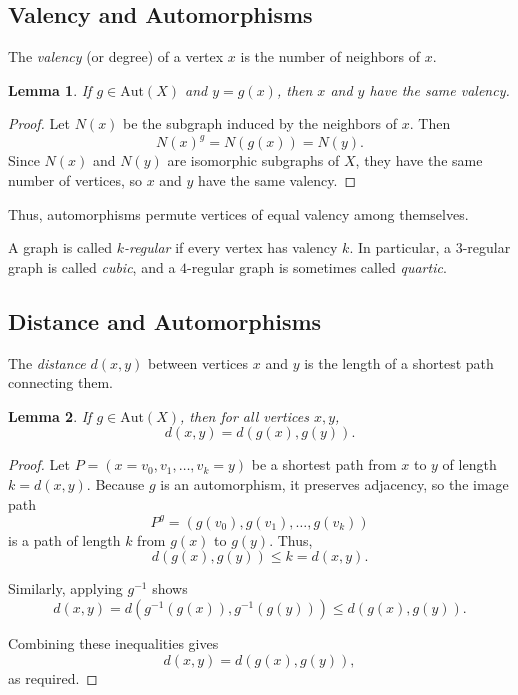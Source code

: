 \documentclass[12pt,a4paper,openany]{book}
\newtheorem{lemma}{Lemma}[section]
\begin{document}
\subsection*{Valency and Automorphisms}

The \emph{valency} (or degree) of a vertex \(x\) is the number of neighbors of \(x\).

\begin{lemma}
If \(g \in \mathrm{Aut}(X)\) and \(y = g(x)\), then \(x\) and \(y\) have the same valency.
\end{lemma}

\begin{proof}
Let \(N(x)\) be the subgraph induced by the neighbors of \(x\).  
Then
\[
N(x)^g = N(g(x)) = N(y).
\]
Since \(N(x)\) and \(N(y)\) are isomorphic subgraphs of \(X\), they have the same number of vertices, so \(x\) and \(y\) have the same valency.
\end{proof}

Thus, automorphisms permute vertices of equal valency among themselves.

A graph is called \emph{\(k\)-regular} if every vertex has valency \(k\).  
In particular, a \(3\)-regular graph is called \emph{cubic}, and a \(4\)-regular graph is sometimes called \emph{quartic}.

\subsection*{Distance and Automorphisms}

The \emph{distance} \(d(x,y)\) between vertices \(x\) and \(y\) is the length of a shortest path connecting them.

\begin{lemma}
If \(g \in \mathrm{Aut}(X)\), then for all vertices \(x,y\),
\[
d(x,y) = d(g(x), g(y)).
\]
\end{lemma}

\begin{proof}
Let \(P = (x = v_0, v_1, \ldots, v_k = y)\) be a shortest path from \(x\) to \(y\) of length \(k = d(x,y)\).  
Because \(g\) is an automorphism, it preserves adjacency, so the image path
\[
P^g = (g(v_0), g(v_1), \ldots, g(v_k))
\]
is a path of length \(k\) from \(g(x)\) to \(g(y)\).  
Thus,
\[
d(g(x), g(y)) \leq k = d(x,y).
\]

Similarly, applying \(g^{-1}\) shows
\[
d(x,y) = d(g^{-1}(g(x)), g^{-1}(g(y))) \leq d(g(x), g(y)).
\]

Combining these inequalities gives
\[
d(x,y) = d(g(x), g(y)),
\]
as required.
\end{proof}
\end{document}
